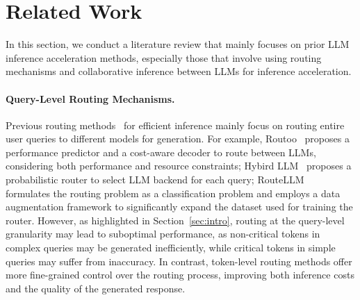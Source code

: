 \section{Related Work}
\label{sec:related}
\vspace{-1em}

In this section, we conduct a literature review that mainly focuses on prior LLM inference acceleration methods, especially those that involve using routing mechanisms and collaborative inference between LLMs for inference acceleration.
\vspace{-1em}
\paragraph{Query-Level Routing Mechanisms.} Previous routing methods~\citep{jang2023exploring,chronopoulou2023adaptersoupweightaveragingimprove,diao2023mixtureofdomainadaptersdecouplinginjectingdomain,lu2023routing,cheng2024damdynamicadaptermerging,lu2024twinmergingdynamicintegrationmodular,chen2023frugalgpt,wang2024fusing,srivatsa-etal-2024-harnessing,stripelis-etal-2024-tensoropera} for efficient inference mainly focus on routing entire user queries to different models for generation. For example, Routoo~\citep{mohammadshahi2024routoolearningroutelarge} proposes a performance predictor and a cost-aware decoder to route between LLMs, considering both performance and resource constraints; Hybird LLM~\citep{ding2024hybridllmcostefficientqualityaware} proposes a probabilistic router to select LLM backend for each query; RouteLLM~\citep{ong2024routellm} formulates the routing problem as a classification problem and employs a data augmentation framework to significantly expand the dataset used for training the router.
However, as highlighted in Section~\ref{sec:intro}, routing at the query-level granularity may lead to suboptimal performance, as non-critical tokens in complex queries may be generated inefficiently, while critical tokens in simple queries may suffer from inaccuracy. In contrast, token-level routing methods offer more fine-grained control over the routing process, improving both inference costs and the quality of the generated response.

\vspace{-1em}
